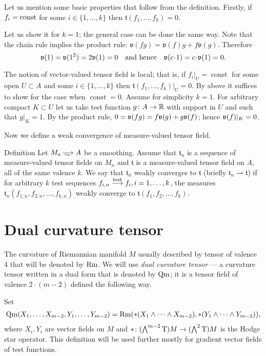 Let us mention some basic properties that follow 
from the definition.
Firstly, if $f_i=\mathrm{const}$  for some $i\in\{1,\dots,k\}$ 
then $\mathfrak{t}(f_1,\dots,f_k)=0.$

Let us show it for $k=1$; the general case can be done the same way.
Note that the chain rule implies the
product rule:
$\mathfrak{v}(fg)=\mathfrak{v}(f)g+f\mathfrak{v}(g)$.
Therefore 
\[\vv(1)=\vv(1^2)=2\vv(1)=0
\quad\text{and hence}\quad
\vv(c\cdot 1)=c\cdot\vv(1)=0.
\]

The notion of vector-valued tensor field is local;
that is, if $f_i|_{U}=\operatorname{const}$
for some open $U\subset A$ and some $i\in\{1,\dots,k\}$ 
 then $\mathfrak{t}(f_1,\dots,f_k)|_U=0.$
By above it suffices to show
for the case when $\operatorname{const}=0$.
Assume for simplicity  $k=1$. 
For arbitrary compact $K\subset U$ let
us take test function $g\colon A\to\mathbb{R}$ with support in
$U$ and such that $g|_K=1$.
By the product rule,
 $0=\mathfrak{v}(fg)=f\mathfrak{v}(g)+g\mathfrak{v}(f)$;
 hence 
$\mathfrak{v}(f)|_K=0$.
 




Now we define a weak convergence of measure-valued tensor field.

\begin{rdef} {Definition}
Let $M_n\smooths{} A$ be a smoothing.
Assume that $\mathfrak{t}_n$ is a sequence of %
 measure-valued tensor fields on $M_n$  and $\mathfrak{t}$ is a
measure-valued tensor field on $A$,
all of the same valence $k$.
We say that $\mathfrak{t}_n$ weakly converges to  $\mathfrak{t}$
(briefly $\mathfrak{t}_n\rightharpoonup\mathfrak{t}$) if for arbitrary $k$
test sequences 
$f_{i,n}\stackrel{\tiny\rm test}{\longrightarrow} f_i, i=1,\dots,k$, the measures $\mathfrak{t}_n(f_{1,n},f_{2,n},\dots,f_{k,n})$ weakly converge to $\mathfrak{t}(f_{1},f_{2},\dots,f_{k})$.
\end{rdef}

\section{Dual curvature tensor}

The curvature of Riemannian manifold $M$ usually described by tensor of valence 4 that will be denoted by $\operatorname{\rm Rm}$.
We will use \emph{dual curvature tensor} --- 
a curvature tensor written in a dual form that is denoted by $\operatorname{\rm Qm}$;
it is a tensor field of valence $2\cdot(m-2)$ defined the following way.

Set
\begin{multline*}
\operatorname{\rm Qm}(X_1,\dots,X_{m-2},Y_1,\dots,Y_{m-2})
= 
\operatorname{\rm Rm}(*(X_1\wedge\dots\wedge X_{m-2}), *(Y_1\wedge\dots\wedge Y_{m-2})),
\end{multline*}
where $X_i,Y_i$ are vector fields on $M$ and  ${*}\colon(\bigwedge^{m-2}\mathrm{T})M\to(\bigwedge^2\mathrm{T})M$ is the  Hodge star operator.
This definition will be used further mostly for gradient vector fields of test functions.

